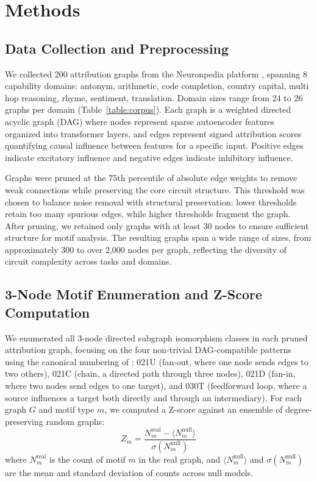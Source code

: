 \section{Methods}\label{sec:methods}

\subsection{Data Collection and Preprocessing}\label{sec:data}
We collected 200 attribution graphs from the Neuronpedia platform \cite{neuronpedia2024}, spanning 8 capability domains: antonym, arithmetic, code completion, country capital, multi hop reasoning, rhyme, sentiment, translation. Domain sizes range from 24 to 26 graphs per domain (Table~\ref{table:corpus}). Each graph is a weighted directed acyclic graph (DAG) where nodes represent sparse autoencoder features \cite{bricken2023monosemanticity} organized into transformer layers, and edges represent signed attribution scores quantifying causal influence between features for a specific input. Positive edges indicate excitatory influence and negative edges indicate inhibitory influence.

Graphs were pruned at the 75th percentile of absolute edge weights to remove weak connections while preserving the core circuit structure. This threshold was chosen to balance noise removal with structural preservation: lower thresholds retain too many spurious edges, while higher thresholds fragment the graph. After pruning, we retained only graphs with at least 30 nodes to ensure sufficient structure for motif analysis. The resulting graphs span a wide range of sizes, from approximately 300 to over 2,000 nodes per graph, reflecting the diversity of circuit complexity across tasks and domains.

\subsection{3-Node Motif Enumeration and Z-Score Computation}\label{sec:motif_enum}
We enumerated all 3-node directed subgraph isomorphism classes in each pruned attribution graph, focusing on the four non-trivial DAG-compatible patterns using the canonical numbering of \citet{milo2002network}: 021U (fan-out, where one node sends edges to two others), 021C (chain, a directed path through three nodes), 021D (fan-in, where two nodes send edges to one target), and 030T (feedforward loop, where a source influences a target both directly and through an intermediary). For each graph $G$ and motif type $m$, we computed a Z-score against an ensemble of degree-preserving random graphs:
\begin{equation}\label{eq:zscore}
Z_m = \frac{N_m^{\text{real}} - \langle N_m^{\text{null}} \rangle}{\sigma(N_m^{\text{null}})}
\end{equation}
where $N_m^{\text{real}}$ is the count of motif $m$ in the real graph, and $\langle N_m^{\text{null}} \rangle$ and $\sigma(N_m^{\text{null}})$ are the mean and standard deviation of counts across null models.

